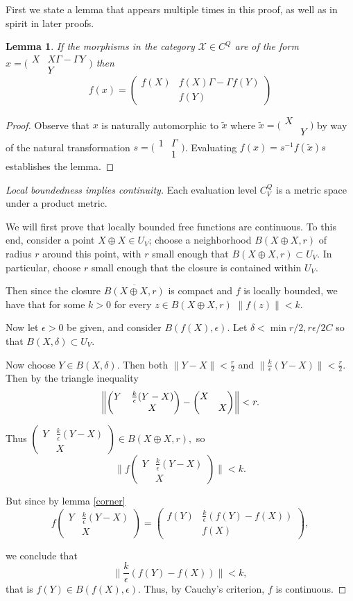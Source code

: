 \documentclass[12pt]{amsart}
\newtheorem{lemma}[theorem]{Lemma}
\theoremstyle{definition}
\numberwithin{equation}{section}
\newcommand{\m}[1]{\bigl(\begin{smallmatrix}#1\end{smallmatrix}\bigr)}
\newcommand{\M}[1]{\begin{pmatrix}#1\end{pmatrix}}
\begin{document}
First we state a lemma that appears multiple times in this proof, as well as in spirit in later proofs. 

\begin{lemma}
If the morphisms in the category $\mathcal X \in C^{Q}$ are of the form $x = \m{X & X\Gamma - \Gamma Y\\& Y}$ then \[f(x) = \M{f(X) & f(X)\Gamma - \Gamma f(Y)\\& f(Y)}\]
\end{lemma}
\begin{proof}\label{corner}
    Observe that $x$ is naturally automorphic to $\tilde x$ where $\tilde x = \m{X &\\&Y}$ by way of the natural transformation $s= \m{1 & \Gamma\\& 1}$. Evaluating $f(x) = s^{-1}f(\tilde x)s$ establishes the lemma.
\end{proof}


\begin{proof}[Local boundedness implies continuity]

    Each evaluation level $C^Q_V$ is a metric space under a product metric. 
    
    We will first prove that locally bounded free functions are continuous. To this end, consider a point $X \oplus X \in U_V$; choose a neighborhood  $B(X\oplus X, r)$  of radius $r$ around this point, with $r$ small enough that  $B(X\oplus X, r)\subset U_V$. In particular, choose $r$ small enough that the closure is contained within $U_V$. 
    
    Then since the closure $\overline {B(X\oplus X, r)}$ is compact and $f$ is locally bounded, we have that for some $k>0$ for every $z\in B(X\oplus X, r)$ $\|f(z)\| < k$.

    Now let $\epsilon > 0$ be given, and consider $B(f(X), \epsilon)$. Let $\delta < \min{r/2, r\epsilon/2C}$ so that $B(X, \delta) \subset U_V$. 

    Now choose $Y \in B(X,\delta)$. Then both $\|Y-X\| < \frac{r}{2}$ and $\|\frac{k}{\epsilon}(Y-X)\| < \frac{r}{2}$. Then by the triangle inequality \[\biggl{\|}\M{Y&\frac{k}{\epsilon}(Y-X)\\&X}-\M{X&\\&X}\biggr{\|} < r.\]

    Thus $\M{Y&\frac{k}{\epsilon}(Y-X)\\&X} \in B(X\oplus X, r),$ so \[\biggl\|f\M{Y&\frac{k}{\epsilon}(Y-X)\\&X}\biggr\| < k.\] 

    But since by lemma \ref{corner} \[f\M{Y&\frac{k}{\epsilon}(Y-X)\\&X} = \M{f(Y) & \frac{k}{\epsilon}(f(Y)-f(X)) \\ &f(X)},\] 

    we conclude that \[\|\frac{k}{\epsilon}(f(Y)-f(X))\| < k,\] that is $f(Y) \in B(f(X), \epsilon).$ Thus, by Cauchy's criterion, $f$ is continuous. \end{proof}
\end{document}
